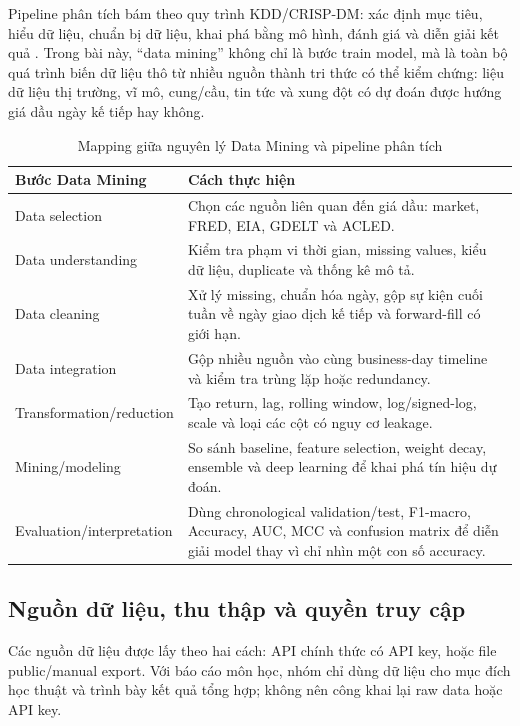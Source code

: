 \documentclass[10pt,a4paper]{article}
\begin{document}
Pipeline phân tích bám theo quy trình KDD/CRISP-DM: xác định mục tiêu, hiểu dữ liệu, chuẩn bị dữ liệu, khai phá bằng mô hình, đánh giá và diễn giải kết quả \cite{fayyad1996,shearer2000}. Trong bài này, ``data mining'' không chỉ là bước train model, mà là toàn bộ quá trình biến dữ liệu thô từ nhiều nguồn thành tri thức có thể kiểm chứng: liệu dữ liệu thị trường, vĩ mô, cung/cầu, tin tức và xung đột có dự đoán được hướng giá dầu ngày kế tiếp hay không.

\begin{table}[!htbp]
\centering
\caption{Mapping giữa nguyên lý Data Mining và pipeline phân tích}
\small
\begin{tabularx}{0.98\linewidth}{lY}
\toprule
\textbf{Bước Data Mining} & \textbf{Cách thực hiện} \\
\midrule
Data selection & Chọn các nguồn liên quan đến giá dầu: market, FRED, EIA, GDELT và ACLED. \\
Data understanding & Kiểm tra phạm vi thời gian, missing values, kiểu dữ liệu, duplicate và thống kê mô tả. \\
Data cleaning & Xử lý missing, chuẩn hóa ngày, gộp sự kiện cuối tuần về ngày giao dịch kế tiếp và forward-fill có giới hạn. \\
Data integration & Gộp nhiều nguồn vào cùng business-day timeline và kiểm tra trùng lặp hoặc redundancy. \\
Transformation/reduction & Tạo return, lag, rolling window, log/signed-log, scale và loại các cột có nguy cơ leakage. \\
Mining/modeling & So sánh baseline, feature selection, weight decay, ensemble và deep learning để khai phá tín hiệu dự đoán. \\
Evaluation/interpretation & Dùng chronological validation/test, F1-macro, Accuracy, AUC, MCC và confusion matrix để diễn giải model thay vì chỉ nhìn một con số accuracy. \\
\bottomrule
\end{tabularx}
\end{table}

\subsection{Nguồn dữ liệu, thu thập và quyền truy cập}

Các nguồn dữ liệu được lấy theo hai cách: API chính thức có API key, hoặc file public/manual export. Với báo cáo môn học, nhóm chỉ dùng dữ liệu cho mục đích học thuật và trình bày kết quả tổng hợp; không nên công khai lại raw data hoặc API key.
\end{document}
